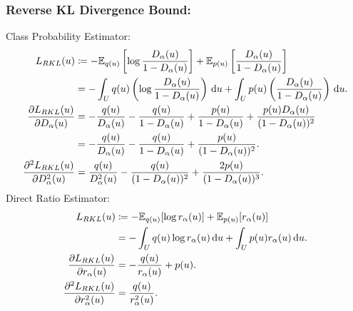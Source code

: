 \documentclass[honours,12pt, twoside]{unswthesis}
\newcommand{\E}{\mathbb{E}}
\numberwithin{equation}{section}
\theoremstyle{definition}
\begin{document}
\subsubsection*{\textbf{Reverse KL Divergence Bound}:}
Class Probability Estimator:
\begin{align*}
L_{RKL}(u)&\coloneqq-\E_{q(u)}\left[\log \frac{D_\alpha(u)}{1-D_\alpha(u)}\right]+\E_{p(u)}\left[\frac{D_\alpha(u)}{1-D_\alpha(u)}\right]\\
&=-\int_U q(u)\left(\log \frac{D_\alpha(u)}{1-D_\alpha(u)}\right)\,{\rm d}u+\int_U p(u)\left(\frac{D_\alpha(u)}{1-D_\alpha(u)}\right)\,{\rm d}u.\\
\frac{\partial L_{RKL}(u)}{\partial D_\alpha(u)}&=-\frac{q(u)}{D_\alpha(u)}-\frac{q(u)}{1-D_\alpha(u)}+\frac{p(u)}{1-D_\alpha(u)}+\frac{p(u)D_\alpha(u)}{(1-D_\alpha(u))^2}\\
&=-\frac{q(u)}{D_\alpha(u)}-\frac{q(u)}{1-D_\alpha(u)}+\frac{p(u)}{(1-D_\alpha(u))^2}.\\
\frac{\partial^2L_{RKL}(u)}{\partial D_\alpha^2(u)}&=\frac{q(u)}{D_\alpha^2(u)}-\frac{q(u)}{(1-D_\alpha(u))^2}+\frac{2p(u)}{(1-D_\alpha(u))^3}.
\end{align*}
Direct Ratio Estimator:
\begin{align}
L_{RKL}(u)&\coloneqq-\E_{q(u)}[\log r_\alpha(u)]+\E_{p(u)}[r_\alpha(u)]\nonumber\\
&=-\int_U q(u)\log r_\alpha(u) \,{\rm d}u+\int_U p(u)r_\alpha(u)\,{\rm d}u.\nonumber\\
\frac{\partial L_{RKL}(u)}{\partial r_\alpha(u)}&=-\frac{q(u)}{r_\alpha(u)}+p(u).\nonumber\\
\frac{\partial^2L_{RKL}(u)}{\partial r_\alpha^2(u)}&=\frac{q(u)}{r_\alpha^2(u)}.
\end{align}
\end{document}
